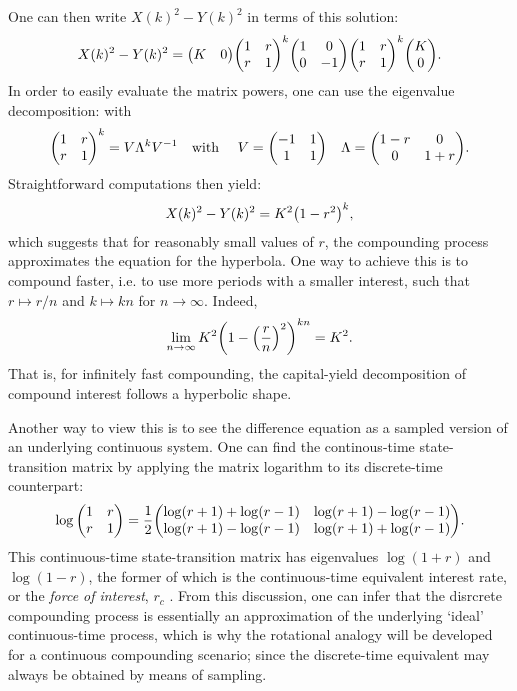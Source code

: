 One can then write $X(k)^2 - Y(k)^2$ in terms of this solution:
$$ X(k)^2 - Y(k)^2 = \mqty(K & 0)\mqty(1& r \\ r & 1)^k\mqty(1 & 0\\0 & -1)\mqty(1& r \\ r & 1)^k\mqty(K\\0).$$
In order to easily evaluate the matrix powers, one can use the eigenvalue decomposition:
with
$$ \mqty(1 & r \\  r & 1)^k = V\Lambda^k V^{-1} \qq{with } V = \mqty(-1 & 1 \\ 1 & 1) \quad \Lambda = \mqty(1 - r & 0\\0 & 1 + r). $$
Straightforward computations then yield:
$$ X(k)^2 - Y(k)^2 = K^2\qty(1 - r^2)^k, $$
which suggests that for reasonably small values of $r$, the compounding process approximates the equation for the hyperbola. One way to achieve this is to compound faster, i.e. to use more periods with a smaller interest, such that $r \mapsto r/n$ and $k \mapsto kn$ for $n \to \infty$. Indeed, 
$$ \lim_{n\to\infty} K^2\qty(1 - \qty(\frac{r}{n})^2)^{kn} = K^2. $$
That is, for infinitely fast compounding, the capital-yield decomposition of compound interest follows a hyperbolic shape.

Another way to view this is to see the difference equation as a sampled version of an underlying continuous system. One can find the continous-time state-transition matrix by applying the matrix logarithm to its discrete-time counterpart:
    $$ \log \mqty(1 & r \\ r & 1) = 
        \frac{1}{2}\mqty(\log(r + 1) + \log(r - 1) & \log(r + 1) - \log(r - 1)\\
                         \log(r + 1) - \log(r - 1) & \log(r + 1) + \log(r - 1)). $$
This continuous-time state-transition matrix has eigenvalues $\log(1 + r)$ and $\log(1 - r)$, the former of which is the continuous-time equivalent interest rate, or the \emph{force of interest}, $r_c$ \cite{Kellison1991}. From this discussion, one can infer that the disrcrete compounding process is essentially an approximation of the underlying `ideal' continuous-time process, which is why the rotational analogy will be developed for a continuous compounding scenario; since the discrete-time equivalent may always be obtained by means of sampling.


